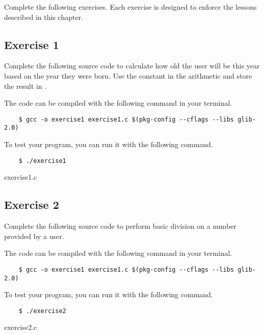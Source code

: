 Complete the following exercises. Each exercise is designed to enforce the
lessons described in this chapter.


\subsection{Exercise 1}
Complete the following source code to calculate how old the user will be this
year based on the year they were born. Use the constant  in
the arithmetic and store the result in .

The code can be compiled with the following command in your terminal.

\begin{Verbatim}
    $ gcc -o exercise1 exercise1.c $(pkg-config --cflags --libs glib-2.0)
\end{Verbatim}

To test your program, you can run it with the following command.

\begin{Verbatim}
    $ ./exercise1
\end{Verbatim}

\begin{code}{exercise1.c}

\end{code}


\subsection{Exercise 2}
Complete the following source code to perform basic division on a number
provided by a user.

The code can be compiled with the following command in your terminal.

\begin{Verbatim}
    $ gcc -o exercise1 exercise1.c $(pkg-config --cflags --libs glib-2.0)
\end{Verbatim}

To test your program, you can run it with the following command.

\begin{Verbatim}
    $ ./exercise2
\end{Verbatim}

\begin{code}{exercise2.c}

\end{code}
